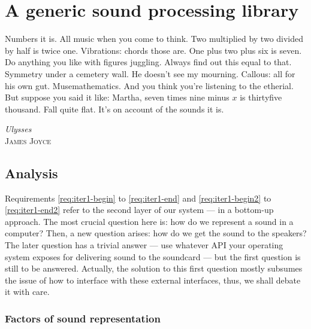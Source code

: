 
\chapter{A generic sound processing library}
\label{sec:03-meta}

{
  \setlength{\epigraphwidth}{.65\textwidth}
  \epigraph{Numbers it is. All music when you come to think.  Two
    multiplied by two divided by half is twice one.  Vibrations:
    chords those are. One plus two plus six is seven. Do anything you
    like with figures juggling. Always find out this equal to
    that. Symmetry under a cemetery wall. He doesn’t see my
    mourning. Callous: all for his own gut. Musemathematics. And you
    think you’re listening to the etherial. But suppose you said it
    like: Martha, seven times nine minus $x$ is thirtyfive thousand.
    Fall quite flat. It’s on account of the sounds it
    is.}{\emph{Ulysses}\\\textsc{James Joyce}} 
}

\section{Analysis}

Requirements \ref{req:iter1-begin} to
\ref{req:iter1-end} and \ref{req:iter1-begin2} to \ref{req:iter1-end2}
refer to the second layer of our system --- in a bottom-up
approach. The most crucial question here is: how do we represent a
sound in a computer? Then, a new question arises: how do we get the
sound to the speakers? The later question has a trivial answer --- use
whatever API your operating system exposes for delivering sound to the
soundcard --- but the first question is still to be
answered. Actually, the solution to this first question mostly
subsumes the issue of how to interface with these external interfaces,
thus, we shall debate it with care.

\subsection{Factors of sound representation}

